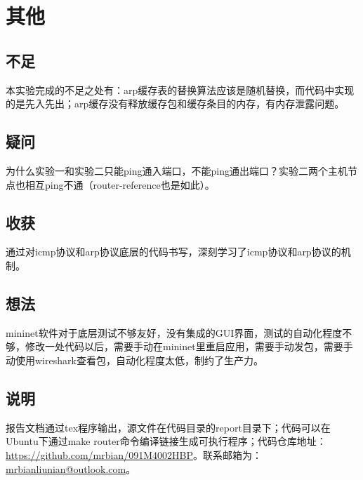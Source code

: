 \documentclass{zjureport}
\begin{document}
   \newpage
   \section{其他}
   \subsection{不足}
      本实验完成的不足之处有：arp缓存表的替换算法应该是随机替换，而代码中实现的是先入先出；arp缓存没有释放缓存包和缓存条目的内存，有内存泄露问题。

   \subsection{疑问}
      为什么实验一和实验二只能ping通入端口，不能ping通出端口？实验二两个主机节点也相互ping不通（router-reference也是如此）。

   \subsection{收获}
      通过对icmp协议和arp协议底层的代码书写，深刻学习了icmp协议和arp协议的机制。

   \subsection{想法}
      mininet软件对于底层测试不够友好，没有集成的GUI界面，测试的自动化程度不够，修改一处代码以后，需要手动在mininet里重启应用，需要手动发包，需要手动使用wireshark查看包，自动化程度太低，制约了生产力。

   \subsection{说明}
     报告文档通过tex程序输出，源文件在代码目录的report目录下；代码可以在Ubuntu下通过make router命令编译链接生成可执行程序；代码仓库地址：\url{https://github.com/mrbian/091M4002HBP}。联系邮箱为：\url{mrbianliunian@outlook.com}。
\end{document}
